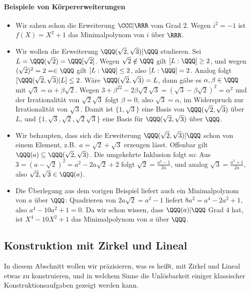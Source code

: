 \documentclass[12pt,a4paper,twoside]{article}
\begin{document}
\paragraph{Beispiele von K\"orpererweiterungen}
\begin{itemize}
\item Wir sahen schon die Erweiterung $\CCC|\RRR$ vom Grad $2$. Wegen $i^2=-1$
  ist $f(X)=X^2+1$ das Minimalpolynom von $i$ \"uber $\RRR$.
\item Wir wollen die Erweiterung $\QQQ(\sqrt{2},\sqrt{3})|\QQQ$ studieren. Sei
  $L=\QQQ(\sqrt{2})=\QQQ[\sqrt{2}]$. Wegen $\sqrt{2}\notin\QQQ$ gilt
  $[L:\QQQ]\ge2$, und wegen $(\sqrt{2})^2=2=\in \QQQ$ gilt
  $[L:\QQQ]\le2$, also $[L:\QQQ]=2$. Analog folgt
  $[\QQQ(\sqrt{2},\sqrt{3})|L]\le 2$. W\"are $\QQQ(\sqrt{2},\sqrt{3})=L$, dann
  g\"abe es $\alpha,\beta\in\QQQ$ mit $\sqrt{3}=\alpha+\beta\sqrt{2}$. Wegen
  $3+\beta^22-2\beta\sqrt{2}\sqrt{3}=(\sqrt{3}-\beta\sqrt{2})^2=\alpha^2$ und
  der Irrationalit\"at von $\sqrt{2}\sqrt{3}$ folgt $\beta=0$, also
  $\sqrt{3}=\alpha$, im Widerspruch zur Irrationalit\"at von $\sqrt{3}$. Damit
  ist $\{1,\sqrt{3}\}$ eine Basis von $\QQQ(\sqrt{2},\sqrt{3})$ \"uber $L$,
  und $\{1,\sqrt{3},\sqrt{2},\sqrt{2}\sqrt{3}\}$ eine Basis f\"ur
  $\QQQ(\sqrt{2},\sqrt{3})$ \"uber $\QQQ$.
\item Wir behaupten, dass sich die Erweiterung $\QQQ(\sqrt{2},\sqrt{3})|\QQQ$
  schon von einem Element, z.B.\ $a=\sqrt{2}+\sqrt{3}$ erzeugen l\"asst.
  Offenbar gilt $\QQQ(a)\subseteq\QQQ(\sqrt{2},\sqrt{3})$. Die umgekehrte
  Inklusion folgt so: Aus $3=(a-\sqrt{2})^2=a^2-2a\sqrt{2}+2$ folgt
  $\sqrt{2}=\frac{a^2-1}{2a}$, und analog $\sqrt{3}=\frac{a^2+1}{2a}$, also
  $\sqrt{2},\sqrt{3}\in\QQQ(a)$.
\item Die \"Uberlegung aus dem vorigen Beispiel liefert auch ein
  Minimalpolynom von $a$ \"uber $\QQQ$: Quadrieren von $2a\sqrt{2}=a^2-1$
  liefert $8a^2=a^4-2a^2+1$, also $a^4-10a^2+1=0$. Da wir schon wissen, dass
  $\QQQ(a)|\QQQ$ Grad $4$ hat, ist $X^4-10X^2+1$ das Minimalpolynom von $a$
  \"uber $\QQQ$.
\end{itemize}
\subsection{Konstruktion mit Zirkel und Lineal}
In diesem Abschnitt wollen wir pr\"azisieren, was es hei\ss t, mit Zirkel und
Lineal etwas zu konstruieren, und in welchem Sinne die Unl\"osbarkeit einiger
klassischer Konstruktionsaufgaben gezeigt werden kann.
\end{document}
